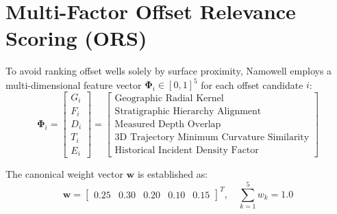 \documentclass[11pt,a4paper]{article}
\begin{document}
\section{Multi-Factor Offset Relevance Scoring (ORS)}
To avoid ranking offset wells solely by surface proximity, Namowell employs a multi-dimensional feature vector $\mathbf{\Phi}_i \in [0, 1]^5$ for each offset candidate $i$:
\begin{equation}
\mathbf{\Phi}_i = \begin{bmatrix} G_i \\ F_i \\ D_i \\ T_i \\ E_i \end{bmatrix} = \begin{bmatrix} \text{Geographic Radial Kernel} \\ \text{Stratigraphic Hierarchy Alignment} \\ \text{Measured Depth Overlap} \\ \text{3D Trajectory Minimum Curvature Similarity} \\ \text{Historical Incident Density Factor} \end{bmatrix}
\end{equation}

The canonical weight vector $\mathbf{w}$ is established as:
\begin{equation}
\mathbf{w} = \begin{bmatrix} 0.25 & 0.30 & 0.20 & 0.10 & 0.15 \end{bmatrix}^T, \quad \sum_{k=1}^5 w_k = 1.0
\end{equation}
\end{document}
